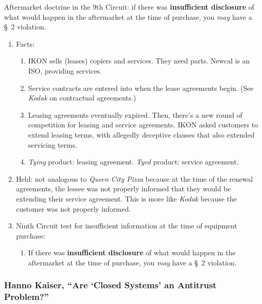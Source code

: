 Aftermarket doctrine in the 9th Circuit: if there was \textbf{insufficient 
disclosure} of what would happen in the aftermarket at the time of purchase, 
you \emph{may} have a \S\ 2 violation.

\begin{enumerate}
    \item Facts:
    \begin{enumerate}
        \item IKON sells (leases) copiers and services. They need parts. 
        Newcal is an ISO, providing services.
        \item Service contracts are entered into when the lease agreements 
        begin. (See \emph{Kodak} on contractual agreements.)
        \item Leasing agreements eventually expired. Then, there's a new round 
        of competition for leasing and service agreements. IKON asked 
        customers to extend leasing terms, with allegedly deceptive clauses 
        that also extended servicing terms.
        \item \emph{Tying} product: leasing agreement. \emph{Tyed} product: 
        service agreement.
    \end{enumerate}
    \item Held: not analogous to \emph{Queen City Pizza} because at the time 
    of the renewal agreements, the lessee was not properly informed that they 
    would be extending their service agreement. This is more like \emph{Kodak} 
    because the customer was not properly informed.
    \item Ninth Circuit test for insufficient information at the time of 
    equipment purchase:
    \begin{enumerate}
        \item If there was \textbf{insufficient disclosure} of what would 
        happen in the aftermarket at the time of purchase, you \emph{may} have 
        a \S\ 2 violation.
    \end{enumerate}
\end{enumerate}

\subsubsection{Hanno Kaiser, ``Are `Closed Systems' an Antitrust Problem?''}

